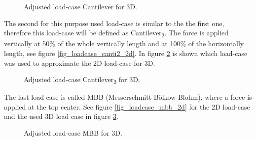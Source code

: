 \begin{figure}[!h]
\begin{minipage}{0.45\textwidth}
\centering
 \def\svgwidth{\textwidth}
 
\caption{Load-case Cantilever in 2D.}  
\label{fig_loadcase_canti_2d}
\end{minipage}
\hfill
\begin{minipage}{0.45\textwidth}
\centering
 \def\svgwidth{\textwidth}
 
\caption{Adjusted load-case Cantilever for 3D.}  
\label{fig_loadcase_canti_3d}
\end{minipage}
\end{figure}

The second for this purpose used load-case is similar to the the first one, therefore this load-case will be defined as Cantilever\textsubscript{2}. The force is applied vertically at 50\% of the whole vertically length and at 100\% of the horizontally length, see figure \ref{fig_loadcase_canti2_2d}. In figure \ref{fig_loadcase_canti2_3d} is shown which load-case was used to approximate the 2D load-case for 3D.\\

\begin{figure}[!h]
\begin{minipage}{0.45\textwidth}
\centering
 \def\svgwidth{\textwidth}
 
\caption{Load-case Cantilever\textsubscript{2} in 2D.}  
\label{fig_loadcase_canti2_2d}
\end{minipage}
\hfill
\begin{minipage}{0.45\textwidth}
\centering
 \def\svgwidth{\textwidth}
 
\caption{Adjusted load-case Cantilever\textsubscript{2} for 3D.}  
\label{fig_loadcase_canti2_3d}
\end{minipage}
\end{figure}

The last load-case is called MBB (Messerschmitt-Bölkow-Blohm),
where a force is applied at the top center. See figure \ref{fig_loadcase_mbb_2d} for the 2D load-case and the used 3D load case in figure \ref{fig_loadcase_mbb_3d}.
\begin{figure}[!h]
\begin{minipage}{0.45\textwidth}
\centering
 \def\svgwidth{\textwidth}
 
\caption{Load-case MBB in 2D.}  
\label{fig_loadcase_mbb_2d}
\end{minipage}
\hfill
\begin{minipage}{0.45\textwidth}
\centering
 \def\svgwidth{\textwidth}
 
\caption{Adjusted load-case MBB for 3D.}  
\label{fig_loadcase_mbb_3d}
\end{minipage}
\end{figure}

